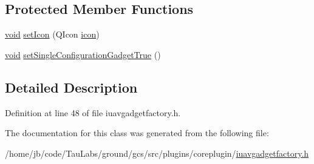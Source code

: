 \subsection*{\-Protected \-Member \-Functions}
\begin{DoxyCompactItemize}
\item 
\hyperlink{group___u_a_v_objects_plugin_ga444cf2ff3f0ecbe028adce838d373f5c}{void} \hyperlink{group___core_plugin_ga2264241e26aef2218c7c7d7fe2193389}{set\-Icon} (\-Q\-Icon \hyperlink{group___core_plugin_ga7db897c61f93d0d66f80236e4433d9f7}{icon})
\item 
\hyperlink{group___u_a_v_objects_plugin_ga444cf2ff3f0ecbe028adce838d373f5c}{void} \hyperlink{group___core_plugin_ga20d35e5c705997979d5c230dbdd42e0e}{set\-Single\-Configuration\-Gadget\-True} ()
\end{DoxyCompactItemize}


\subsection{\-Detailed \-Description}


\-Definition at line 48 of file iuavgadgetfactory.\-h.



\-The documentation for this class was generated from the following file\-:\begin{DoxyCompactItemize}
\item 
/home/jb/code/\-Tau\-Labs/ground/gcs/src/plugins/coreplugin/\hyperlink{iuavgadgetfactory_8h}{iuavgadgetfactory.\-h}\end{DoxyCompactItemize}
